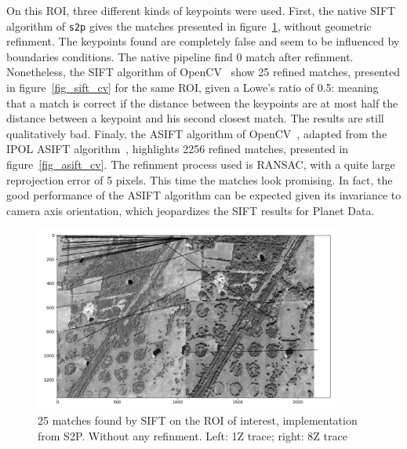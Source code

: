 \documentclass[paper=a4, fontsize=11pt, onecolumn, tikz, dvipsnames, svgnames, x11names]{article}
\begin{document}
On this ROI, three different kinds of keypoints were used. First, the native SIFT algorithm of \verb$s2p$ gives the matches presented in figure~\ref{fig_sift_s2p}, without geometric refinment. The keypoints found are completely false and seem to be influenced by boundaries conditions. The native pipeline find 0 match after refinment. Nonetheless, the SIFT algorithm of OpenCV~\cite{opencv_library} show 25 refined matches, presented in figure~\ref{fig_sift_cv} for the same ROI, given a Lowe's ratio of 0.5: meaning that a match is correct if the distance between the keypoints are at most half the distance between a keypoint and his second closest match. The results are still qualitatively bad. Finaly, the ASIFT algorithm of OpenCV~\cite{opencv_library}, adapted from the IPOL ASIFT algorithm~\cite{ipol_asift}, highlights 2256 refined matches, presented in figure~\ref{fig_asift_cv}. The refinment process used is RANSAC, with a quite large reprojection error of 5 pixels. This time the matches look promising.
In fact, the good performance of the ASIFT algorithm can be expected given its invariance to camera axis orientation, which jeopardizes the SIFT results for Planet Data.

\begin{figure}[H]
    \centering
    \includegraphics[width = 0.9\textwidth]{sift_s2p_d1_2.jpeg}
    \caption{25 matches found by SIFT on the ROI of interest, implementation from S2P. Without any refinment. Left: 1Z trace; right: 8Z trace}
    \label{fig_sift_s2p}
\end{figure}
\end{document}
